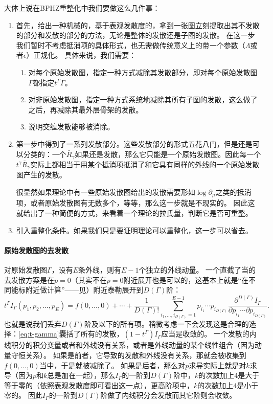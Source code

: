 \documentclass[hyperref, UTF8, a4paper]{ctexart}
\renewcommand{\autoref}{\prettyref}
\begin{document}
大体上说在BPHZ重整化中我们要做这么几件事：
\begin{enumerate}
    \item 首先，给出一种机械的，基于表观发散度的，拿到一张图立刻提取出其不发散的部分和发散的部分的方法，无论是整体的发散还是子图的发散。
    在这一步我们暂时不考虑抵消项的具体形式，也无需做传统意义上的带一个参数（$\Lambda$或者$\epsilon$）正规化。
    具体来说，我们需要：
    \begin{enumerate}
        \item 对每个原始发散图，指定一种方式减除其发散部分，即对每个原始发散图$\Gamma$都指定$t^\Gamma \Gamma$。
        \item 对非原始发散图，指定一种方式系统地减除其所有子图的发散，这么做了之后，再减除其最外层骨架的发散。
        \item 说明交缠发散能够被消除。
    \end{enumerate}
    \item 第一步中得到了一系列发散部分。这些发散部分的形式五花八门，但是还是可以分类的：一个$\bar{R}_\gamma$如果还是发散，那么它只能是一个原始发散图。因此每一个$t^\gamma \bar{R}_\gamma$实际上都相当于用某个抵消项抵消了和它具有同样的外线的一个原始发散图产生的发散。
    
    很显然如果理论中有一些原始发散图给出的发散需要形如$\log \partial_\mu$之类的抵消项，或者原始发散图有无数多个，等等，那么这一步就是不现实的。
    因此这就给出了一种简便的方式，来看着一个理论的拉氏量，判断它是否可重整。
    \item 引入重整化条件。如果我们只是要证明理论可以重整化，这一步可以省去。
\end{enumerate}

\paragraph{原始发散图的去发散} 对原始发散图$\Gamma$，设有$E$条外线，则有$E-1$个独立的外线动量。
一个直截了当的去发散方案是在$p=0$（其实不在$p=0$附近展开也是可以的，这基本上就是“在不同能标附近做计算”——见\autoref{sec:rg}）附近泰勒展开到$D(\Gamma)$阶：
\begin{equation}
    t^\Gamma I_\Gamma(p_1, p_2, \ldots, p_E) = f(0, \ldots, 0) + \cdots + \frac{1}{D(\Gamma)!} \sum_{i_1, \ldots, i_{D(\Gamma)} = 1}^{E-1} p_{i_1} \cdots p_{i_{D(\Gamma)}} \frac{\partial^{D(\Gamma)} I_\Gamma}{\partial p_{i_1} \cdots \partial p_{i_{D(\Gamma)}}}.
    \label{eq:t-gamma}
\end{equation}
也就是说我们丢弃$D(\Gamma)$阶及以下的所有项。稍微考虑一下会发现这是合理的选择：\eqref{eq:t-gamma}囊括了所有的发散，$(1-t^\Gamma) I_\Gamma$应当是收敛的。
一个发散的内线积分的积分变量或者和外线没有关系，或者是外线动量的某个线性组合（因为动量守恒关系）。
如果是前者，它导致的发散和外线没有关系，那就会被收集到$f(0, \ldots, 0)$当中，于是就被减除了。
如果是后者，那么对$p$求导实际上就是对$k$求导（因为$p$和$k$总是加在一起），那么$I_\Gamma$的一阶到$D(\Gamma)$阶中，$k$的次数加上$4$是大于等于零的（依照表观发散度即可看出这一点），更高阶项中，$k$的次数加上$4$是小于零的。
因此$I_\Gamma$的一阶到$D(\Gamma)$阶做了内线积分会发散而其它阶则会收敛。
\end{document}

